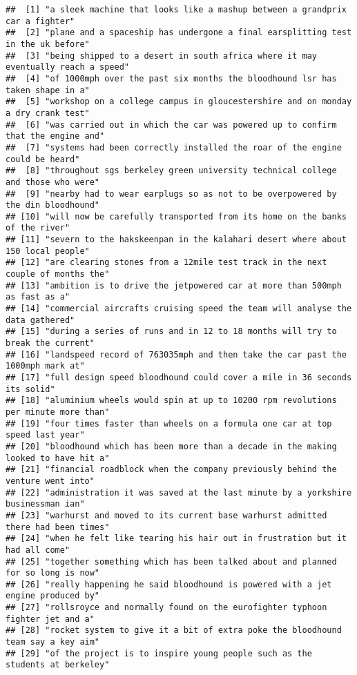 \documentclass[]{article}
\begin{document}
\begin{verbatim}
##  [1] "a sleek machine that looks like a mashup between a grandprix car a fighter"     
##  [2] "plane and a spaceship has undergone a final earsplitting test in the uk before" 
##  [3] "being shipped to a desert in south africa where it may eventually reach a speed"
##  [4] "of 1000mph over the past six months the bloodhound lsr has taken shape in a"    
##  [5] "workshop on a college campus in gloucestershire and on monday a dry crank test" 
##  [6] "was carried out in which the car was powered up to confirm that the engine and" 
##  [7] "systems had been correctly installed the roar of the engine could be heard"     
##  [8] "throughout sgs berkeley green university technical college and those who were"  
##  [9] "nearby had to wear earplugs so as not to be overpowered by the din bloodhound"  
## [10] "will now be carefully transported from its home on the banks of the river"      
## [11] "severn to the hakskeenpan in the kalahari desert where about 150 local people"  
## [12] "are clearing stones from a 12mile test track in the next couple of months the"  
## [13] "ambition is to drive the jetpowered car at more than 500mph as fast as a"       
## [14] "commercial aircrafts cruising speed the team will analyse the data gathered"    
## [15] "during a series of runs and in 12 to 18 months will try to break the current"   
## [16] "landspeed record of 763035mph and then take the car past the 1000mph mark at"   
## [17] "full design speed bloodhound could cover a mile in 36 seconds its solid"        
## [18] "aluminium wheels would spin at up to 10200 rpm revolutions per minute more than"
## [19] "four times faster than wheels on a formula one car at top speed last year"      
## [20] "bloodhound which has been more than a decade in the making looked to have hit a"
## [21] "financial roadblock when the company previously behind the venture went into"   
## [22] "administration it was saved at the last minute by a yorkshire businessman ian"  
## [23] "warhurst and moved to its current base warhurst admitted there had been times"  
## [24] "when he felt like tearing his hair out in frustration but it had all come"      
## [25] "together something which has been talked about and planned for so long is now"  
## [26] "really happening he said bloodhound is powered with a jet engine produced by"   
## [27] "rollsroyce and normally found on the eurofighter typhoon fighter jet and a"     
## [28] "rocket system to give it a bit of extra poke the bloodhound team say a key aim" 
## [29] "of the project is to inspire young people such as the students at berkeley"     

\end{verbatim}
\end{document}
